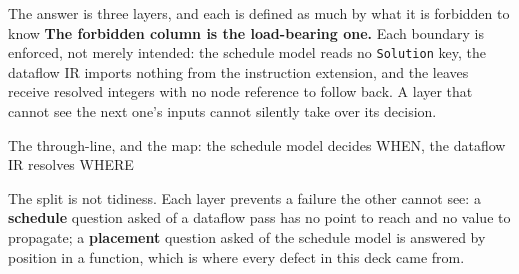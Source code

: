 \documentclass[aspectratio=169,9pt]{beamer}
\newcommand{\tsub}[1]{{\footnotesize\color{gray}#1}}
\newcommand{\key}[1]{\textcolor{acc}{\textbf{#1}}}
\begin{document}
\begin{frame}{The answer is three layers, and each is defined as much by what it is forbidden to know}
\vspace{1mm}
{\scriptsize \key{The forbidden column is the load-bearing one.} Each boundary is enforced, not
merely intended: the schedule model reads no \texttt{Solution} key, the dataflow IR imports nothing
from the instruction extension, and the leaves receive resolved integers with no node reference to
follow back. A layer that cannot see the next one's inputs cannot silently take over its decision.}

\end{frame}

\begin{frame}{The through-line, and the map: the schedule model decides WHEN, the dataflow IR resolves WHERE}

\begin{center}
\end{center}

\vspace{2mm}
{\footnotesize The split is not tidiness. Each layer prevents a failure the other cannot see:
a \key{schedule} question asked of a dataflow pass has no point to reach and no value to
propagate; a \key{placement} question asked of the schedule model is answered by position in a
function, which is where every defect in this deck came from.}


\end{frame}
\end{document}
